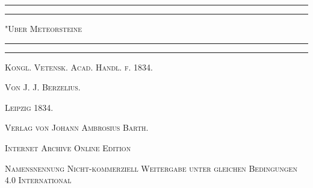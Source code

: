\documentclass[a4paper, 11pt, oneside]{article}
\begin{document}
\swabfamily
\renewcommand{\contentsname}{
\swabfamily{Inhaltsverzeichnis}
}
\begin{titlepage} %
	\centering %

	
	\rule{\textwidth}{1.6pt}\vspace*{-\baselineskip}\vspace*{2pt} %
	\rule{\textwidth}{0.4pt} %
	
	\vspace{1\baselineskip} %
	
	{\scshape\Huge "Uber Meteorsteine\\[1.25pt]}
	
	\vspace{1\baselineskip} %

	\rule{\textwidth}{0.4pt}\vspace*{-\baselineskip}\vspace{3.2pt} %
	\rule{\textwidth}{1.6pt} %
	
	\vspace{1\baselineskip} %
	
	
	{\Large\scshape Kongl. Vetensk. Acad. Handl. f. 1834.} %
	
	\vspace*{1\baselineskip} %
	
    {\scshape\Large Von J. J. Berzelius.} %
    
    \vspace*{\fill}

	\vspace{1\baselineskip}

	{\Large\scshape Leipzig 1834.}
	
	{\Large\scshape{Verlag von Johann Ambrosius Barth.}}
	
	\vspace{0.5\baselineskip} %

    \scshape\Large Internet Archive Online Edition  %
	
	{\scshape\Large Namensnennung Nicht-kommerziell Weitergabe unter gleichen Bedingungen 4.0 International} %
\end{titlepage}
\setlength{\parskip}{1mm plus1mm minus1mm}
\clearpage
\tableofcontents
\clearpage
\LARGE
\pagestyle{fancy}
\fancyhf{}
\cfoot{\swabfamily{\thepage}}
\end{document}
